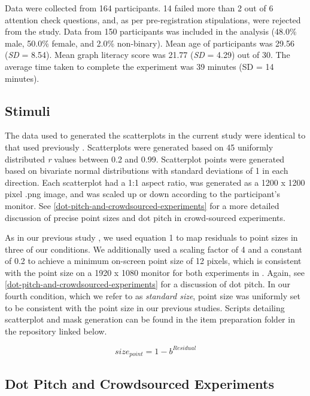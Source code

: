 \documentclass{vgtc}                          %
\begin{document}
Data were collected from 164 participants. 14 failed more than 2 out of 6 attention
check questions, and, as per pre-registration stipulations, were rejected from the study. Data
from 150 participants was included in the analysis (48.0\% male, 50.0\% female, and 2.0\% non-binary). Mean age of participants was 29.56 (\emph{SD} = 8.54). Mean graph literacy score was 21.77
(\emph{SD} = 4.29) out of 30. The average time taken to complete
the experiment was 39 minutes (SD = 14 minutes).

\hypertarget{stimuli}{%
\subsection{Stimuli}\label{stimuli}}

The data used to generated the scatterplots in the current study were identical to that
used previously \cite{strain_2023}. Scatterplots were generated based on 45 uniformly distributed \emph{r} values
between 0.2 and 0.99. Scatterplot points were generated based on bivariate normal
distributions with standard deviations of 1 in each direction. Each scatterplot
had a 1:1 aspect ratio, was generated as a 1200 x 1200 pixel .png image, and was
scaled up or down according to the participant's monitor. See \autoref{dot-pitch-and-crowdsourced-experiments}
for a more detailed discussion of precise point sizes and dot pitch in crowd-sourced
experiments.

As in our previous study \cite{strain_2023}, we used equation 1 to map residuals
to point sizes in three of our conditions. We additionally used a scaling factor of 4 and a constant of 0.2 to achieve a
minimum on-screen point size of 12 pixels, which is consistent with the point size on
a 1920 x 1080 monitor for both experiments in \cite{strain_2023}. Again, see \autoref{dot-pitch-and-crowdsourced-experiments} for a discussion of dot pitch. In our fourth condition, which we refer to as \emph{standard size}, point size was uniformly
set to be consistent with the point size in our previous studies.
Scripts detailing scatterplot and mask generation can be found in the item
preparation folder in the repository linked below.

\begin{equation}
  size_{point} = 1 - b^{Residual}
\end{equation}

\hypertarget{dot-pitch-and-crowdsourced-experiments}{%
\subsection{Dot Pitch and Crowdsourced Experiments}\label{dot-pitch-and-crowdsourced-experiments}}
\end{document}
